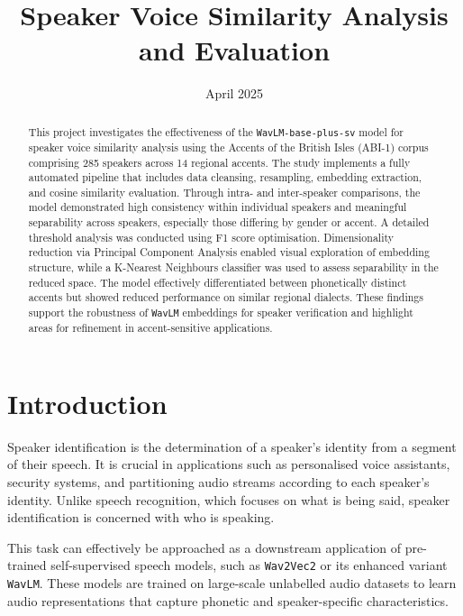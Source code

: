 \documentclass[conference]{IEEEtran}
\begin{document}
		
	\title{Speaker Voice Similarity Analysis and Evaluation}
	
	\author{
		\date{April 2025}
		}
	
	\maketitle
	
	\begin{abstract}
		This project investigates the effectiveness of the \texttt{WavLM-base-plus-sv} model for speaker voice similarity analysis using the Accents of the British Isles (ABI-1) corpus comprising 285 speakers across 14 regional accents. The study implements a fully automated pipeline that includes data cleansing, resampling, embedding extraction, and cosine similarity evaluation. Through intra- and inter-speaker comparisons, the model demonstrated high consistency within individual speakers and meaningful separability across speakers, especially those differing by gender or accent. A detailed threshold analysis was conducted using F1 score optimisation. Dimensionality reduction via Principal Component Analysis enabled visual exploration of embedding structure, while a K-Nearest Neighbours classifier was used to assess separability in the reduced space. The model effectively differentiated between phonetically distinct accents but showed reduced performance on similar regional dialects. These findings support the robustness of \texttt{WavLM} embeddings for speaker verification and highlight areas for refinement in accent-sensitive applications.
	\end{abstract}
	
	\section{Introduction}
	
	Speaker identification is the determination of a speaker's identity from a segment of their speech. It is crucial in applications such as personalised voice assistants, security systems, and partitioning audio streams according to each speaker's identity. Unlike speech recognition, which focuses on what is being said, speaker identification is concerned with who is speaking.
	
	This task can effectively be approached as a downstream application of pre-trained self-supervised speech models, such as \texttt{Wav2Vec2}\cite{baevski2020wav2vec} or its enhanced variant \texttt{WavLM}\cite{chen2022wavlm}. These models are trained on large-scale unlabelled audio datasets to learn audio representations that capture phonetic and speaker-specific characteristics.
	
\end{document}
